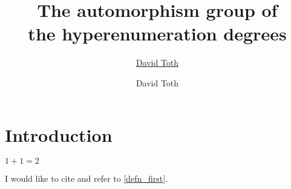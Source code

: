 \documentclass{article}
\title{The automorphism group of\\the hyperenumeration degrees}
\author{\href{mailto:mmdt@leeds.ac.uk}{David Toth}}
\author{David Toth}
\begin{document}
\maketitle

\setcounter{secnumdepth}{2}
\setcounter{tocdepth}{2}

\tableofcontents


\section{Introduction}
\begin{thm}\label{defn_first}
$1+1=2$
\end{thm}

I would like to cite \cite{caidefining} and refer to \ref{defn_first}.

%
%
%


\end{document}
